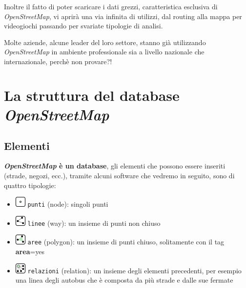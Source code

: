 \documentclass[a4paper,twoside,12pt,]{article}
\newcommand{\osm}{\emph{OpenStreetMap}\xspace}
\newcommand{\key}[1]{\textsf{\textbf{#1}}}
\newcommand{\val}[1]{\textsf{#1}}
\begin{document}
Inoltre il fatto di poter scaricare i dati grezzi, caratteristica esclusiva di \osm, vi aprirà una via infinita di utilizzi, dal routing alla mappa per videogiochi passando per svariate tipologie di analisi.

Molte aziende, alcune leader del loro settore, stanno già utilizzando \osm in ambiente professionale sia a livello nazionale che internazionale, perchè non provare?!

\section{La struttura del database \osm}
\subsection{Elementi}
\textbf{\osm è un database}, gli elementi che possono essere inseriti (strade, negozi, ecc.), tramite alcuni software che vedremo in seguito, sono di quattro tipologie:
\begin{itemize}
 \item \includegraphics{./Mf_node.png} \texttt{punti} (node): singoli punti
 \item \includegraphics{./Mf_way.png} \texttt{linee} (way): un insieme di punti non chiuso
 \item \includegraphics{./Mf_area.png} \texttt{aree} (polygon): un insieme di punti chiuso, solitamente con il tag \key{area}=\val{yes}
 \item \includegraphics{./Mf_relation.png} \texttt{relazioni} (relation): un insieme degli elementi precedenti, per esempio una linea degli autobus che è composta da più strade e dalle sue fermate
\end{itemize}
\end{document}
